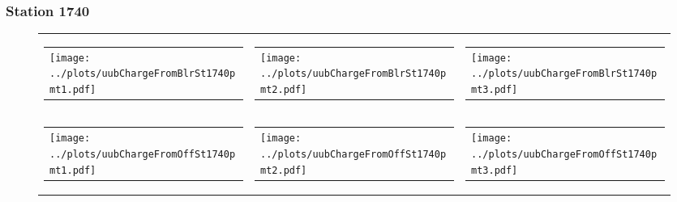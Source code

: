 \documentclass[aspectratio=169]{beamer}
\begin{document}
\begin{frame} 
  \frametitle{Station 1740}
 
  \begin{figure}
    \centering
    \begin{tabularx}{\textwidth}{LCR}
      \begin{tabular}{l}
        \texttt{[image: ../plots/uubChargeFromBlrSt1740pmt1.pdf]}
      \end{tabular}
      &
      \begin{tabular}{l}
        \texttt{[image: ../plots/uubChargeFromBlrSt1740pmt2.pdf]}
      \end{tabular}
      &
      \begin{tabular}{l}
        \texttt{[image: ../plots/uubChargeFromBlrSt1740pmt3.pdf]}
      \end{tabular}
      \\
      \begin{tabular}{l}
        \texttt{[image: ../plots/uubChargeFromOffSt1740pmt1.pdf]}
      \end{tabular}
      &
      \begin{tabular}{l}
        \texttt{[image: ../plots/uubChargeFromOffSt1740pmt2.pdf]}
      \end{tabular}
      &
      \begin{tabular}{l}
        \texttt{[image: ../plots/uubChargeFromOffSt1740pmt3.pdf]}
      \end{tabular}
    \end{tabularx}
  \end{figure}
\end{frame}
\end{document}
